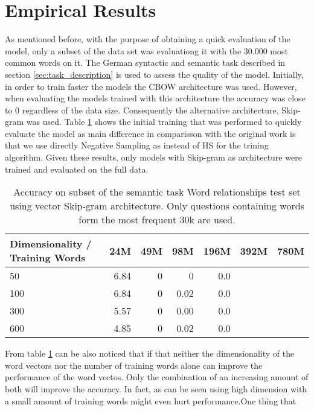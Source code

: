 \section{Empirical Results}
\label{sec:sub_empirical_results}

As mentioned before, with the purpose of obtaining  a quick evaluation of the
model, only a subset of the data set was evaluationg it with the 30.000 
most common words on it. The German syntactic and semantic task described in
section \ref{sec:task_description} is used  to assess the quality of the
model. Initially, in order to train faster the
models  the \ac{CBOW} architecture was used. However, when evaluating the
models trained with this architecture the  accuracy was close to 0
regardless of the data size. Consequently the alternative architecture,
Skip-gram was used.  Table  \ref{tab:initial_w2v_training}  shows the initial
training that was performed to quickly evaluate the model as main difference
in comparisson with the original work is that we use directly Negative
Sampling as instead of \ac{HS} for the trining algorithm.  Given these
results, only models with Skip-gram as architecture were trained and evaluated on the full data. 

\begin{table}[h]
\centering
\caption{Accuracy on subset of the semantic task Word relationships test set using
vector Skip-gram architecture. Only questions containing words form the most
 frequent 30k are used.} 
\label{tab:initial_w2v_training}



\small
\begin{tabular}{|l|r|r|r|r|l|l|}
\hline
 Dimensionality / Training Words  &   24M  &  49M  &   98M  &  196M  &  392M  &  780M  \\
\hline
                              50  &  6.84  &    0  &     0  &   0.0  &        &        \\
                             100  &  6.84  &    0  &  0.02  &   0.0  &        &        \\
                             300  &  5.57  &    0  &  0.00  &   0.0  &        &        \\
                             600  &  4.85  &    0  &  0.02  &   0.0  &        &        \\
\end{tabular}
\end{table}

From table \ref{tab:initial_w2v_training} can be also noticed that  if that
neither the dimensionality of the word vectors nor the number of
training words alone can improve the performance of the word vectos. Only the
combination of an increasing amount of both will improve the accuracy. In
fact, as can be seen using high dimension with a small amount of training
words might even hurt performance.One thing that

